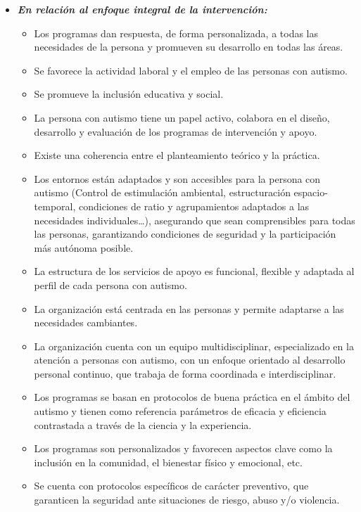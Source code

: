 \begin{itemize}
\begin{itemize}
\begin{itemize}
		\end{itemize}
		\item \textbf{\textit{En relación al enfoque integral de la intervención:}}
		\begin{itemize}
			\item Los programas dan respuesta, de forma personalizada, a todas las necesidades de la persona y promueven su desarrollo en todas las áreas.  
			\item Se favorece la actividad laboral y el empleo de las personas con autismo. 
			\item Se promueve la inclusión educativa y social. 
			\item La persona con autismo tiene un papel activo, colabora en el diseño, desarrollo y evaluación de los programas de intervención y apoyo.  
			\item Existe una coherencia entre el planteamiento teórico y la práctica.  
			\item Los entornos están adaptados y son accesibles para la persona con autismo (Control de estimulación ambiental, estructuración espacio-temporal, condiciones de ratio y agrupamientos adaptados a las necesidades individuales…), asegurando que sean comprensibles para todas las personas, garantizando condiciones de seguridad y la participación más autónoma posible.  
			\item La estructura de los servicios de apoyo es funcional, flexible y adaptada al perfil de cada persona con autismo.  
			\item La organización está centrada en las personas y permite adaptarse a las necesidades cambiantes.  
			\item La organización cuenta con un equipo multidisciplinar, especializado en la atención a personas con autismo, con un enfoque orientado al desarrollo personal continuo, que trabaja de forma coordinada e interdisciplinar. 
			\item Los programas se basan en protocolos de buena práctica en el ámbito del autismo y tienen como referencia parámetros de eficacia y eficiencia contrastada a través de la ciencia y la experiencia.  
			\item Los programas son personalizados y favorecen aspectos clave como la inclusión en la comunidad, el bienestar físico y emocional, etc.  
			\item Se cuenta con protocolos específicos de carácter preventivo, que garanticen la seguridad ante situaciones de riesgo, abuso y/o violencia. 
		\end{itemize}
		

\end{itemize}
\end{itemize}

